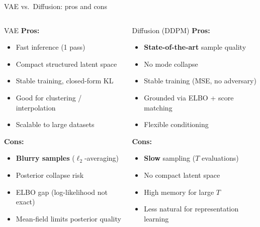 \documentclass[aspectratio=169,11pt]{beamer}
\begin{document}
\begin{frame}{VAE vs.\ Diffusion: pros and cons}

\begin{columns}[T]
\begin{block}{VAE}
\textcolor{green!60!black}{\textbf{Pros:}}
\begin{itemize}\footnotesize\setlength\itemsep{1pt}
  \item Fast inference (1 pass)
  \item Compact structured latent space
  \item Stable training, closed-form KL
  \item Good for clustering / interpolation
  \item Scalable to large datasets
\end{itemize}
\textcolor{red!60!black}{\textbf{Cons:}}
\begin{itemize}\footnotesize\setlength\itemsep{1pt}
  \item \textbf{Blurry samples} ($\ell_2$-averaging)
  \item Posterior collapse risk
  \item ELBO gap (log-likelihood not exact)
  \item Mean-field limits posterior quality
\end{itemize}
\end{block}

\begin{block}{Diffusion (DDPM)}
\textcolor{green!60!black}{\textbf{Pros:}}
\begin{itemize}\footnotesize\setlength\itemsep{1pt}
  \item \textbf{State-of-the-art} sample quality
  \item No mode collapse
  \item Stable training (MSE, no adversary)
  \item Grounded via ELBO + score matching
  \item Flexible conditioning
\end{itemize}
\textcolor{red!60!black}{\textbf{Cons:}}
\begin{itemize}\footnotesize\setlength\itemsep{1pt}
  \item \textbf{Slow} sampling ($T$ evaluations)
  \item No compact latent space
  \item High memory for large $T$
  \item Less natural for representation learning
\end{itemize}
\end{block}
\end{columns}
\end{frame}
\end{document}
